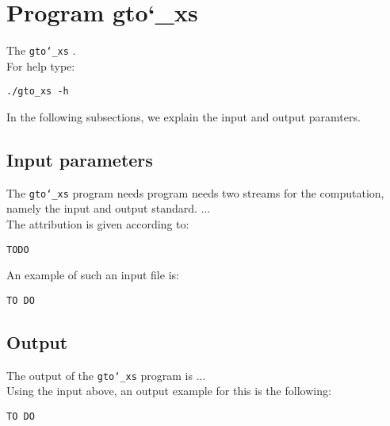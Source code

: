 \section{Program gto\char`_xs}
The \texttt{gto\char`_xs} .\\
For help type:
\begin{lstlisting}
./gto_xs -h
\end{lstlisting}
In the following subsections, we explain the input and output paramters.

\subsection*{Input parameters}

The \texttt{gto\char`_xs} program needs program needs two streams for the computation, namely the input and output standard. ...\\
The attribution is given according to:
\begin{lstlisting}
TODO
\end{lstlisting}
An example of such an input file is:
\begin{lstlisting}
TO DO
\end{lstlisting}

\subsection*{Output}
The output of the \texttt{gto\char`_xs} program is ...\\
Using the input above, an output example for this is the following:
\begin{lstlisting}
TO DO
\end{lstlisting}